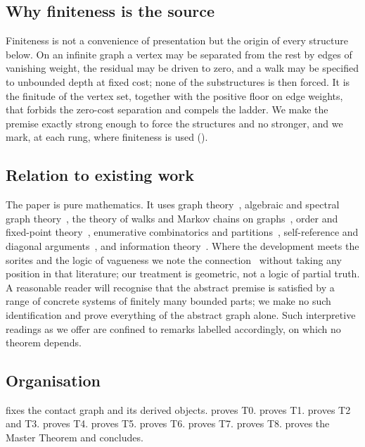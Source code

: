 \documentclass[11pt,a4paper]{article}
\theoremstyle{thmstyle}
\theoremstyle{definition}
\theoremstyle{remark}
\begin{document}
\subsection{Why finiteness is the source}

Finiteness is not a convenience of presentation but the origin of every
structure below. On an infinite graph a vertex may be separated from the rest by
edges of vanishing weight, the residual may be driven to zero, and a walk may be
specified to unbounded depth at fixed cost; none of the substructures is then
forced. It is the finitude of the vertex set, together with the positive floor
on edge weights, that forbids the zero-cost separation and compels the ladder.
We make the premise exactly strong enough to force the structures and no
stronger, and we mark, at each rung, where finiteness is used
().

\subsection{Relation to existing work}

The paper is pure mathematics. It uses graph theory~\citep{bondymurty2008,%
diestel2017,west2001,bollobas1998}, algebraic and spectral graph
theory~\citep{godsilroyle2001,chung1997,fiedler1973,cheeger1970}, the theory of
walks and Markov chains on graphs~\citep{lovasz1993,levinperes2017}, order and
fixed-point theory~\citep{daveypriestley2002,birkhoff1967,tarski1955},
enumerative combinatorics and partitions~\citep{stanley2012,andrews1976},
self-reference and diagonal arguments~\citep{russell1903,cantor1891,lawvere1969,%
godel1931}, and information theory~\citep{shannon1948,cover2006}. Where the
development meets the sorites and the logic of vagueness we note the
connection~\citep{black1937,williamson1994} without taking any position in that
literature; our treatment is geometric, not a logic of partial truth. A
reasonable reader will recognise that the abstract premise is satisfied by a
range of concrete systems of finitely many bounded parts; we make no such
identification and prove everything of the abstract graph alone. Such
interpretive readings as we offer are confined to remarks labelled accordingly,
on which no theorem depends.

\subsection{Organisation}

 fixes the contact graph and its derived objects.
 proves T0.  proves T1. 
proves T2 and T3.  proves T4.  proves T5.
 proves T6.  proves T7.
 proves T8.  proves the Master Theorem and
concludes.
\end{document}
